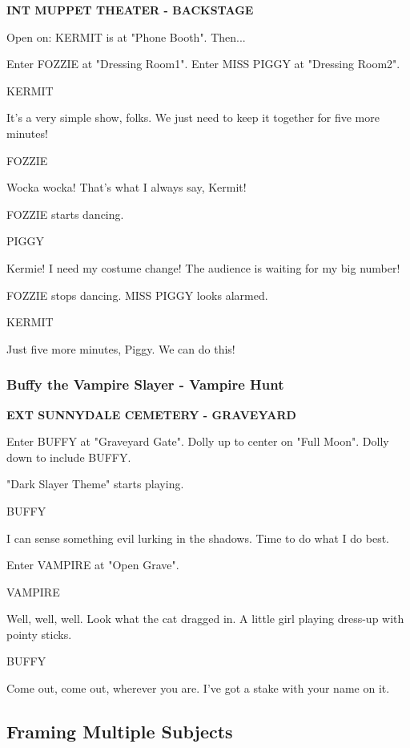 \documentclass[11pt,letterpaper,oldstylefigures]{memoir}
\newcommand{\slugline}[1]{\nobreak\textbf{\MakeUppercase{#1}}\par\nobreak\vspace{1\baselineskip}}
\newcommand{\speaker}[1]{\nobreak\hspace*{0.333\textwidth}\MakeUppercase{#1}\par\nobreak\vspace{0.5\baselineskip}}
\newcommand{\dialogue}[1]{\nobreak\hspace*{0.25\textwidth}\begin{minipage}{0.5\textwidth}#1\end{minipage}\par\vspace{1\baselineskip}}
\newcommand{\stagedir}[1]{#1\par\vspace{1\baselineskip}}
\newenvironment{FountainExample}
  {\begingroup
  \ttfamily\small
   \setlength{\parindent}{0pt}
  \setlength{\parskip}{0.5em}
  \allowdisplaybreaks
  \setlength{\displaywidowpenalty}{0}
  \setlength{\widowpenalty}{0}
  \setlength{\clubpenalty}{0}
  \setlength{\interlinepenalty}{0}
}
  {\endgroup}
\begin{document}
\begin{FountainExample}
\slugline{INT MUPPET THEATER - BACKSTAGE}

\stagedir{Open on: KERMIT is at "Phone Booth". Then...}
\stagedir{Enter FOZZIE at "Dressing Room1". Enter MISS PIGGY at "Dressing Room2".}

\speaker{KERMIT}
\dialogue{It's a very simple show, folks. We just need to keep it together for five more minutes!}

\speaker{FOZZIE}
\dialogue{Wocka wocka! That's what I always say, Kermit!}

\stagedir{FOZZIE starts dancing.}

\speaker{PIGGY}
\dialogue{Kermie! I need my costume change! The audience is waiting for my big number!}

\stagedir{FOZZIE stops dancing. MISS PIGGY looks alarmed.}

\speaker{KERMIT}
\dialogue{Just five more minutes, Piggy. We can do this!}
\end{FountainExample}

\subsubsection*{Buffy the Vampire Slayer - Vampire Hunt}
\label{ex:buffy-the-vampire-slayer-vampire-hunt}

\begin{FountainExample}
\slugline{EXT SUNNYDALE CEMETERY - GRAVEYARD}

\stagedir{Enter BUFFY at "Graveyard Gate". Dolly up to center on "Full Moon". Dolly down to include BUFFY.}
\stagedir{"Dark Slayer Theme" starts playing.}

\speaker{BUFFY}
\dialogue{I can sense something evil lurking in the shadows. Time to do what I do best.}

\stagedir{Enter VAMPIRE at "Open Grave".}

\speaker{VAMPIRE}
\dialogue{Well, well, well. Look what the cat dragged in. A little girl playing dress-up with pointy sticks.}

\speaker{BUFFY}
\dialogue{Come out, come out, wherever you are. I've got a stake with your name on it.}
\end{FountainExample}

\subsection{Framing Multiple Subjects}
\end{document}
